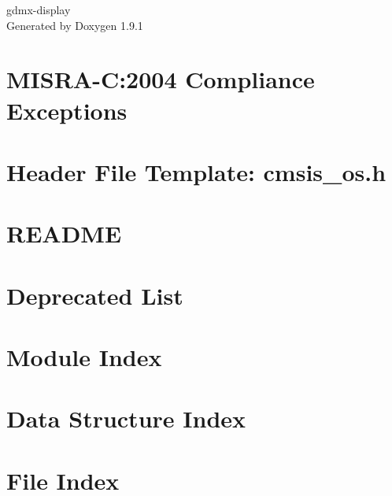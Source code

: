 \let\mypdfximage\pdfximage\def\pdfximage{\immediate\mypdfximage}\documentclass[twoside]{book}
\newcommand{\+}{\discretionary{\mbox{\scriptsize$\hookleftarrow$}}{}{}}
\newcommand{\clearemptydoublepage}{%
  \newpage{\pagestyle{empty}\cleardoublepage}%
}
\begin{document}
\raggedbottom

\hypersetup{pageanchor=false,
             bookmarksnumbered=true,
             pdfencoding=unicode
            }
\begin{titlepage}
\vspace*{7cm}
\begin{center}%
{\Large gdmx-\/display }\\
\vspace*{1cm}
{\large Generated by Doxygen 1.9.1}\\
\end{center}
\end{titlepage}
\clearemptydoublepage
{}
\tableofcontents
\clearemptydoublepage
{}
\hypersetup{pageanchor=true}

\chapter{MISRA-\/C\+:2004 Compliance Exceptions}
\label{_c_m_s_i_s__m_i_s_r_a__exceptions}

\chapter{Header File Template\+: cmsis\+\_\+os.\+h}
\label{cmsis_os_h}

\chapter{README}
\label{md__r_e_a_d_m_e}

\chapter{Deprecated List}
\label{deprecated}

\chapter{Module Index}

\chapter{Data Structure Index}

\chapter{File Index}

\end{document}
